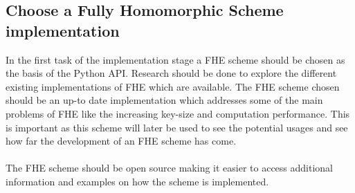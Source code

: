 \subsection{Choose a Fully Homomorphic Scheme implementation}
In the first task of the implementation stage a FHE scheme should be chosen as the basis of the Python API. Research should be done to explore the different existing implementations of FHE which are available. The FHE scheme chosen should be an up-to date implementation which addresses some of the main problems of FHE like the increasing key-size and computation performance. This is important as this scheme will later be used to see the potential usages and see how far the development of an FHE scheme has come.\\\\
The FHE scheme should be open source making it easier to access additional information and examples on how the scheme is implemented.
